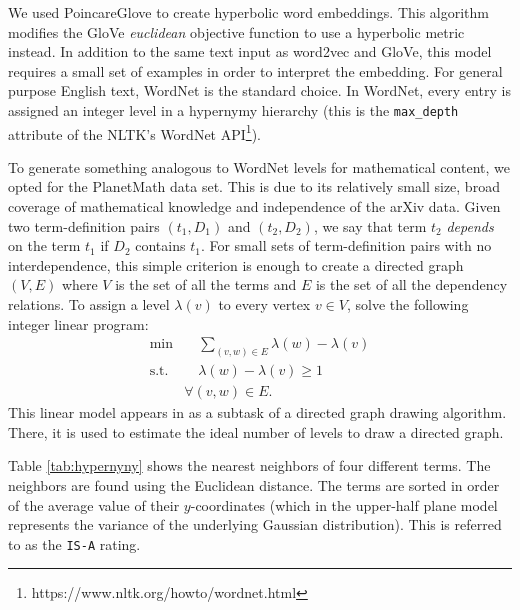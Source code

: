 \documentclass[submission,copyright,creativecommons]{eptcs}
\newcommand{\isa}{\texttt{IS-A}\xspace}
\begin{document}
We used PoincareGlove \cite{tifrea2018poincare} to create hyperbolic
word embeddings. This algorithm modifies the GloVe \textit{euclidean} objective function to use a hyperbolic metric instead. 
In addition to the same text input as word2vec and GloVe, this model requires a small set of examples in order to interpret the embedding. 
For general purpose English text, WordNet \cite{wordnet} is the standard  choice. 
In WordNet, every entry is assigned an integer level in a hypernymy hierarchy (this is the
\texttt{max\_depth} attribute of the NLTK's WordNet
API\footnote{https://www.nltk.org/howto/wordnet.html}). 

To generate something  analogous to WordNet levels for mathematical content, we opted for the PlanetMath data set. This is due to its relatively small size, broad coverage of mathematical knowledge and independence of the arXiv data. 
 Given two term-definition pairs $(t_1, D_1)$ and $(t_2, D_2)$, we say that term
$t_2$ \emph{depends} on the term $t_1$ if $D_2$ contains $t_1$.
For small sets of term-definition pairs with no interdependence, this
simple criterion is enough to create a directed graph $(V, E)$ where
$V$ is the set of all the terms and $E$ is the set of all the
dependency relations. To assign a level $\lambda (v)$ to every 
vertex $v\in V$, solve the following integer linear program:
\begin{align*}
    \text{min} & \quad \sum_{(v,w) \in E} \lambda(w) - \lambda(v)  \\
    \text{s.t.} & \quad \lambda(w) - \lambda(v) \geq 1  \\
     & \forall (v,w) \in E. 
\end{align*}
This linear model appears in \cite{graphsGasner} as a subtask of a directed graph drawing algorithm. There, it is used to estimate the ideal number of levels to draw a directed graph. 


Table \ref{tab:hypernyny} shows the nearest neighbors of four
different terms.  The neighbors are found using the Euclidean distance. 
The terms are 
sorted in order of the average value of their $y$-coordinates (which in
the upper-half plane model represents the variance of the underlying
Gaussian distribution). This is referred to as the \isa rating.
\end{document}
